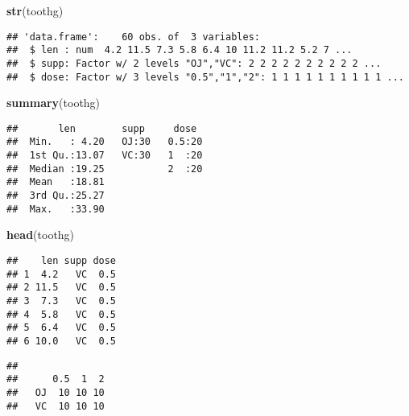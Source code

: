 \documentclass[
]{article}
\newenvironment{Shaded}{\begin{snugshade}}{\end{snugshade}}
\newcommand{\KeywordTok}[1]{\textcolor[rgb]{0.13,0.29,0.53}{\textbf{#1}}}
\newcommand{\NormalTok}[1]{#1}
\newcommand{\OperatorTok}[1]{\textcolor[rgb]{0.81,0.36,0.00}{\textbf{#1}}}
\begin{document}
\begin{Shaded}
\begin{Highlighting}[]
\KeywordTok{str}\NormalTok{(toothg)}
\end{Highlighting}
\end{Shaded}

\begin{verbatim}
## 'data.frame':    60 obs. of  3 variables:
##  $ len : num  4.2 11.5 7.3 5.8 6.4 10 11.2 11.2 5.2 7 ...
##  $ supp: Factor w/ 2 levels "OJ","VC": 2 2 2 2 2 2 2 2 2 2 ...
##  $ dose: Factor w/ 3 levels "0.5","1","2": 1 1 1 1 1 1 1 1 1 1 ...
\end{verbatim}

\begin{Shaded}
\begin{Highlighting}[]
\KeywordTok{summary}\NormalTok{(toothg)}
\end{Highlighting}
\end{Shaded}

\begin{verbatim}
##       len        supp     dose   
##  Min.   : 4.20   OJ:30   0.5:20  
##  1st Qu.:13.07   VC:30   1  :20  
##  Median :19.25           2  :20  
##  Mean   :18.81                   
##  3rd Qu.:25.27                   
##  Max.   :33.90
\end{verbatim}

\begin{Shaded}
\begin{Highlighting}[]
\KeywordTok{head}\NormalTok{(toothg)}
\end{Highlighting}
\end{Shaded}

\begin{verbatim}
##    len supp dose
## 1  4.2   VC  0.5
## 2 11.5   VC  0.5
## 3  7.3   VC  0.5
## 4  5.8   VC  0.5
## 5  6.4   VC  0.5
## 6 10.0   VC  0.5
\end{verbatim}

\begin{Shaded}
\end{Shaded}

\begin{verbatim}
##     
##      0.5  1  2
##   OJ  10 10 10
##   VC  10 10 10
\end{verbatim}
\end{document}
